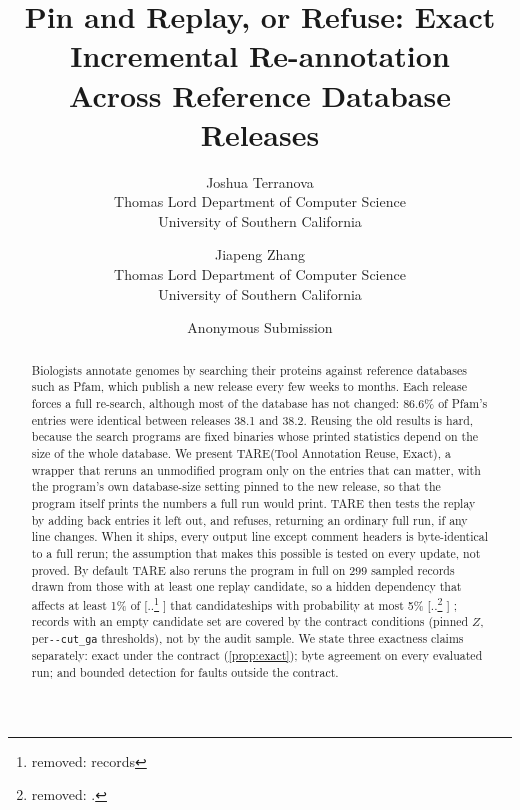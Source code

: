\documentclass[letterpaper,twocolumn,10pt]{article}
\author{{\rm Joshua Terranova}\\Thomas Lord Department of Computer Science\\University of Southern California
      \and {\rm Jiapeng Zhang}\\Thomas Lord Department of Computer Science\\University of Southern California}}
\author{Anonymous Submission}
\title{Pin and Replay, or Refuse: Exact Incremental Re\nobreakdash-annotation\\
Across Reference Database Releases}
\date{}
\theoremstyle{definition}
\newcommand{\sys}{TARE\xspace}
\newcommand{\sysexpansion}{Tool Annotation Reuse, Exact}
\newcommand{\sys}{PARE\xspace}
\newcommand{\sysexpansion}{Pin And Replay Exact}
\newcommand{\cutga}{\texttt{-{}-cut\_ga}\xspace}
\providecommand{\DIFadd}[1]{{\protect\color{blue} \sf #1}} %
\providecommand{\DIFdel}[1]{{\protect\color{red} [..\footnote{removed: #1} ]}} %
\providecommand{\DIFaddbegin}{} %
\providecommand{\DIFaddend}{} %
\providecommand{\DIFdelbegin}{} %
\providecommand{\DIFdelend}{} %
\providecommand{\DIFscaledelfig}{0.5}
\newlength{\DIFdelgraphicswidth} %
\newlength{\DIFdelgraphicsheight} %
\providecommand{\DIFaddincludegraphics}[2][]{{\color{blue}\fbox{\DIFOincludegraphics[#1]{#2}}}} %
\providecommand{\DIFdelincludegraphics}[2][]{%
\sbox{\DIFdelgraphicsbox}{\DIFOincludegraphics[#1]{#2}}%
\settoboxwidth{\DIFdelgraphicswidth}{\DIFdelgraphicsbox} %
\settoboxtotalheight{\DIFdelgraphicsheight}{\DIFdelgraphicsbox} %
\scalebox{\DIFscaledelfig}{%
\parbox[b]{\DIFdelgraphicswidth}{\usebox{\DIFdelgraphicsbox}\\[-\baselineskip] \rule{\DIFdelgraphicswidth}{0em}}\llap{\resizebox{\DIFdelgraphicswidth}{\DIFdelgraphicsheight}{%
\setlength{\unitlength}{\DIFdelgraphicswidth}%
\begin{picture}(1,1)%
\thicklines\linethickness{2pt} %
{\color[rgb]{1,0,0}\put(0,0){\framebox(1,1){}}}%
{\color[rgb]{1,0,0}\put(0,0){\line( 1,1){1}}}%
{\color[rgb]{1,0,0}\put(0,1){\line(1,-1){1}}}%
\end{picture}%
}\hspace*{3pt}}} %
} %
\DeclareRobustCommand{\DIFaddbegin}{\DIFOaddbegin \let\includegraphics\DIFaddincludegraphics} %
\DeclareRobustCommand{\DIFaddend}{\DIFOaddend \let\includegraphics\DIFOincludegraphics} %
\DeclareRobustCommand{\DIFdelbegin}{\DIFOdelbegin \let\includegraphics\DIFdelincludegraphics} %
\DeclareRobustCommand{\DIFdelend}{\DIFOaddend \let\includegraphics\DIFOincludegraphics} %
\begin{document}
\maketitle

\begin{abstract}
Biologists annotate genomes by searching their proteins against reference databases such as Pfam, which publish a
new release every few weeks to months. Each release forces a full re\nobreakdash-search, although most of the database has not
changed: 86.6\% of Pfam's entries were identical between releases 38.1 and 38.2.
Reusing the old results is hard, because the search programs are fixed binaries whose printed statistics depend on
the size of the whole database. We present \sys (\sysexpansion), a wrapper that reruns an unmodified
program only on the entries that can matter, with the program's own database\nobreakdash-size setting pinned to the new
release, so that the program itself prints the numbers a full run would print. \sys then tests the replay by adding
back entries it left out, and refuses, returning an ordinary full run, if any line changes. When it ships, every
output line except comment headers is byte\nobreakdash-identical to a full rerun; the assumption that makes this
possible is tested on every update, not proved. By default \sys also reruns the program in full on 299 sampled records
\DIFaddbegin \DIFadd{drawn from those with at least one replay candidate}\DIFaddend , so a hidden dependency that affects at least 1\% of \DIFdelbegin \DIFdel{records }\DIFdelend \DIFaddbegin \DIFadd{that
candidate}\nobreakdash\DIFadd{-bearing population }\DIFaddend ships with probability at most 5\%\DIFdelbegin \DIFdel{.
}\DIFdelend \DIFaddbegin \DIFadd{; records with an empty candidate set are covered by
the contract conditions (pinned $Z$, per}\nobreakdash\DIFadd{-family }\cutga \DIFadd{thresholds), not by the audit sample. We state three exactness
claims separately: exact under the contract (\cref{prop:exact}); byte agreement on every evaluated run; and bounded
detection for faults outside the contract.
}\DIFaddend %


\end{abstract}
\end{document}

